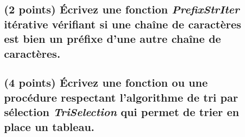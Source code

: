 \documentclass[11pt,a4paper]{article}
\begin{document}
\bigskip

\begin{center}
\end{center}

\bigskip

\subsection{(2 points) \'Ecrivez une fonction \og \textit{PrefixStrIter} \fg{} itérative vérifiant si une chaîne de caractères est bien un préfixe d'une autre chaîne de caractères. }

\bigskip

\begin{center}
\end{center}

\bigskip

\subsection{(4 points) \'Ecrivez une fonction ou une procédure respectant l'algorithme de tri par sélection \og \textit{TriSelection} \fg{} qui permet de trier en place un tableau. }

\bigskip

\begin{center}
\end{center}
\end{document}
